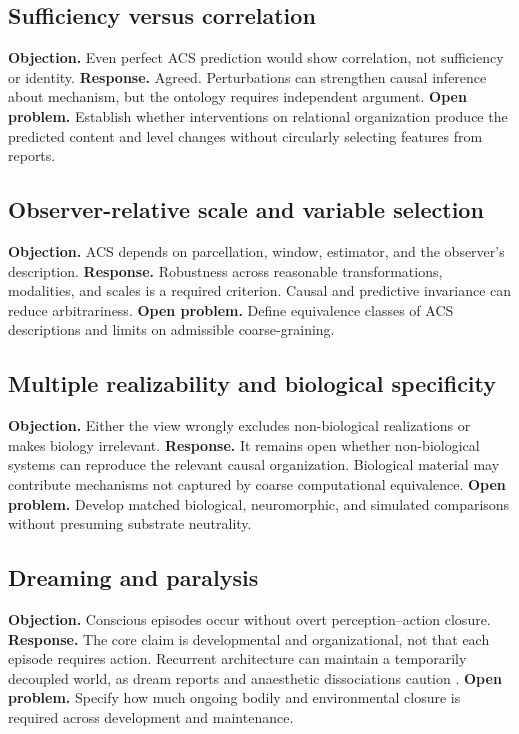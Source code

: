 \documentclass[
  11pt,
  a4paper,
]{article}
\begin{document}
\subsection{Sufficiency versus
correlation}\label{sufficiency-versus-correlation}

\textbf{Objection.} Even perfect ACS prediction would show correlation,
not sufficiency or identity. \textbf{Response.} Agreed. Perturbations
can strengthen causal inference about mechanism, but the ontology
requires independent argument. \textbf{Open problem.} Establish whether
interventions on relational organization produce the predicted content
and level changes without circularly selecting features from reports.

\subsection{Observer-relative scale and variable
selection}\label{observer-relative-scale-and-variable-selection}

\textbf{Objection.} ACS depends on parcellation, window, estimator, and
the observer's description. \textbf{Response.} Robustness across
reasonable transformations, modalities, and scales is a required
criterion. Causal and predictive invariance can reduce arbitrariness.
\textbf{Open problem.} Define equivalence classes of ACS descriptions
and limits on admissible coarse-graining.

\subsection{Multiple realizability and biological
specificity}\label{multiple-realizability-and-biological-specificity}

\textbf{Objection.} Either the view wrongly excludes non-biological
realizations or makes biology irrelevant. \textbf{Response.} It remains
open whether non-biological systems can reproduce the relevant causal
organization. Biological material may contribute mechanisms not captured
by coarse computational equivalence. \textbf{Open problem.} Develop
matched biological, neuromorphic, and simulated comparisons without
presuming substrate neutrality.

\subsection{Dreaming and paralysis}\label{dreaming-and-paralysis}

\textbf{Objection.} Conscious episodes occur without overt
perception--action closure. \textbf{Response.} The core claim is
developmental and organizational, not that each episode requires action.
Recurrent architecture can maintain a temporarily decoupled world, as
dream reports and anaesthetic dissociations caution \citep{sarasso2015}.
\textbf{Open problem.} Specify how much ongoing bodily and environmental
closure is required across development and maintenance.
\end{document}
